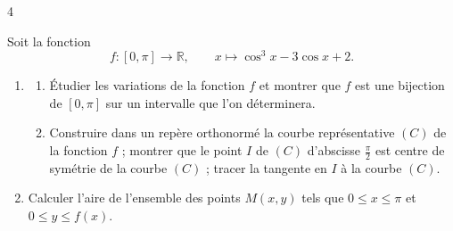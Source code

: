 \documentclass{axiobac}
\begin{document}
\entete

\begin{exercice}{4}

Soit la fonction
\[
f : [0, \pi] \longrightarrow \mathbb{R}, \qquad x \longmapsto \cos^3 x - 3\cos x + 2 .
\]

\begin{enumerate}
    \item
    \begin{enumerate}
        \item Étudier les variations de la fonction $f$ et montrer que $f$ est une bijection de $[0, \pi]$ sur un intervalle que l'on déterminera.
        \item Construire dans un repère orthonormé la courbe représentative $(C)$ de la fonction $f$ ; montrer que le point $I$ de $(C)$ d'abscisse $\frac{\pi}{2}$ est centre de symétrie de la courbe $(C)$ ; tracer la tangente en $I$ à la courbe $(C)$.
    \end{enumerate}
    \item Calculer l'aire de l'ensemble des points $M(x, y)$ tels que $0 \leqslant x \leqslant \pi$ et $0 \leqslant y \leqslant f(x)$.
\end{enumerate}

\end{exercice}
\end{document}
